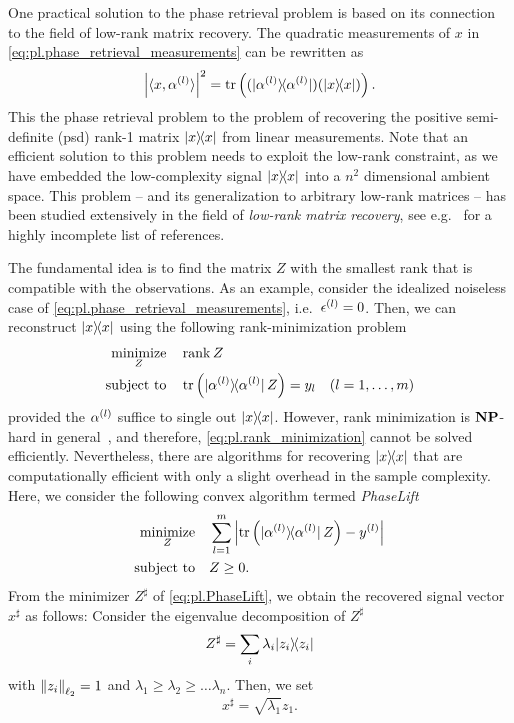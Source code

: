 One practical solution to the phase retrieval problem is based on its connection to the field of low-rank matrix recovery.
The quadratic measurements of $x$ in \cref{eq:pl.phase_retrieval_measurements} can be rewritten as
\[
  \left| \langle {x}, \alpha^{(l)} \rangle \right|^2
  = \tr \left( (\ket{\alpha^{(l)}}\bra{\alpha^{(l)}}) (\ket{{x}}\bra{{x}}) \right).
\]
This  the phase retrieval problem to the problem of recovering the positive semi-definite (psd) rank-1 matrix $\ketbra{x}$ from linear measurements.
Note that an efficient solution to this problem needs to exploit the low-rank constraint, as we have embedded the low-complexity signal $\ketbra{x}$ into a $n^2$ dimensional ambient space.
This problem -- and its generalization to arbitrary low-rank matrices -- has been studied extensively in the field of \emph{low-rank matrix recovery}, see e.g.~\cite{Ahmed_2014_Blind,Candes_2009_Exact,Candes_2011_Tight,Recht_2010_Guaranteed,Gross_2011_Recovering,Chen_2015_IncoherenceOptimal} for a highly incomplete list of references.

The fundamental idea is to find the matrix $Z$ with the smallest rank that is compatible with the observations.
As an example, consider the idealized noiseless case of \cref{eq:pl.phase_retrieval_measurements}, i.e.\ $\epsilon^{(l)} = 0$.
Then, we can reconstruct $\ketbra{x}$ using the following rank-minimization problem
\[
  \begin{split}
    \underset{{Z}}{\textrm{minimize}} &\quad \rank Z \\
    \textrm{subject to} &\quad  \tr\left( \ketbra{\alpha\ind{l}} \, Z \right) = y_l \quad (l=1,\ldots,m)
  \end{split}
  \label{eq:pl.rank_minimization}
\]
provided the $\alpha^{(l)}$ suffice to single out $\ketbra{x}$.
However, rank minimization is $\mathbf{NP}$-hard in general~\cite{Boyd_2004_Convex}, and therefore, \cref{eq:pl.rank_minimization} cannot be solved efficiently.
Nevertheless, there are algorithms for recovering $\ketbra{x}$ that are computationally efficient with only a slight overhead in the sample complexity.
Here, we consider the following convex algorithm termed \emph{PhaseLift}~\cite{Candes_2013_Phaselift}
\[
  \label{eq:pl.PhaseLift}
  \begin{split}
    \underset{{Z}}{\textrm{minimize}} & \quad \sum_{l=1}^m \left| \tr \left( \ket{\alpha^{(l)}} \bra{\alpha^{(l)}} \, {Z} \right) - y^{(l)} \right| \\
    \textrm{subject to} &\quad  {Z} \geq 0.
  \end{split}
\]
From the minimizer $Z^\sharp$ of \cref{eq:pl.PhaseLift}, we obtain the recovered signal vector ${ x}^\sharp$ as follows:
Consider the eigenvalue decomposition of $Z^\sharp$
\[
  Z^\sharp = \sum_i \lambda_i \ketbra{z_i}
\]
with ${\Vert z_i\Vert}_{\ell_2} = 1$ and $\lambda_1 \ge \lambda_2 \ge \ldots \lambda_n$.
Then, we set
\[
  x^\sharp = \sqrt{\lambda_1} z_1.
  \label{eq:pl.vector_from_matrix}
\]

